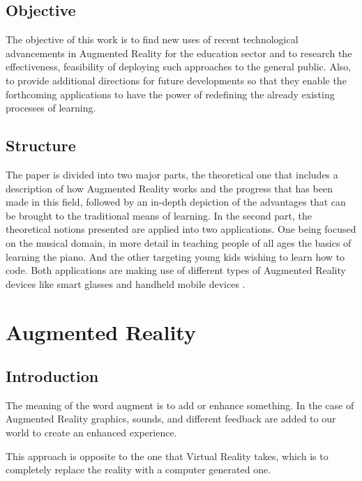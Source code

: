 \documentclass[12 pct]{report}
\begin{document}
\section{Objective}
The objective of this work is to find new uses of recent technological advancements in Augmented Reality for the education sector and to research the effectiveness, feasibility of deploying such approaches to the general public. Also, to provide additional directions for future developments so that they enable the forthcoming applications to have the power of redefining the already existing processes of learning.

\section{Structure}
The paper is divided into two major parts, the theoretical one that includes a description of how Augmented Reality works and the progress that has been made in this field, followed by an in-depth depiction of the advantages that can be brought to the traditional means of learning. 
In the second part, the theoretical notions presented are applied into two applications.
One being focused on the musical domain, in more detail in teaching people of all ages the basics of learning the piano.
And the other targeting young kids wishing to learn how to code. 
Both applications are making use of different types of Augmented Reality devices like smart glasses \cite{rauschnabel2016augmented} and handheld mobile devices \cite{wagner2005towards}.

\chapter{Augmented Reality}

\section{Introduction}
The meaning of the word augment is to add or enhance something. In the case of Augmented Reality \cite{milgram1995augmented} graphics, sounds, and different feedback are added to our world to create an enhanced experience.

This approach is opposite to the one that Virtual Reality \cite{burdea2003virtual}  takes, which is to completely replace the reality with a computer generated one.
\end{document}
